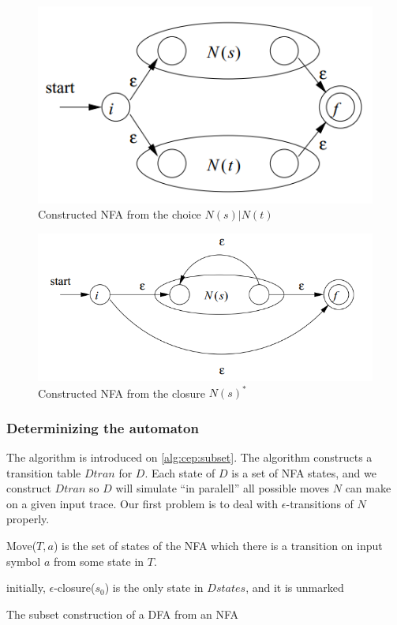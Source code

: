 			\begin{figure}[h]
			\centering
			\includegraphics[width=0.5\linewidth]{figures/chapter_4/subexpression_choice}
			\caption{Constructed NFA from the choice $N(s)|N(t)$ \redraw}
			\label{fig:cep:nfachoice}
			\end{figure}

			\begin{figure}[h]
			\centering
			\includegraphics[width=0.5\linewidth]{figures/chapter_4/subexpression_asterisk}
			\caption{Constructed NFA from the closure $N(s)^*$ \redraw}
			\label{fig:cep:nfasterisk}
			\end{figure}

		\needspace{5cm}
		\subsubsection{Determinizing the automaton}

			The algorithm is introduced on \cref{alg:cep:subset}.
			The algorithm constructs a transition table $\mathit{Dtran}$ for $D$. Each state of $D$ is a set of NFA states, and we construct $\mathit{Dtran}$ so $D$ will simulate ``in paralell'' all possible moves $N$ can make on a given input trace. Our first problem is to deal with $\epsilon$-transitions of $N$ properly.


			Move($T,a$) is the set of states of the NFA which there is a transition on input symbol $a$ from some state in $T$.

			\begin{algorithm}
			\SetAlgoLined
			initially, $\epsilon$-closure($s_0$) is the only state in $\mathit{Dstates}$, and it is unmarked\;
			\caption{The subset construction of a DFA from an NFA}
			\label{alg:cep:subset}
			\end{algorithm}



